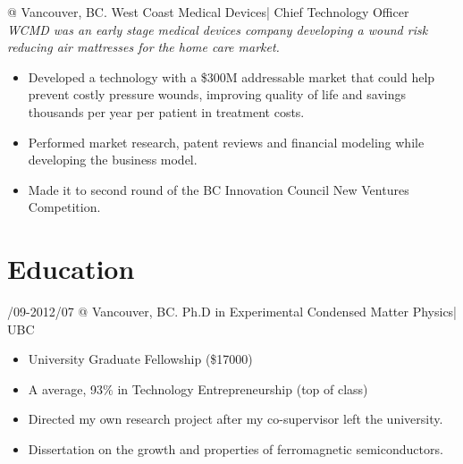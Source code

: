 \documentclass[10pt,letterpaper]{resume}
\begin{document}

 @ Vancouver, BC. West Coast Medical Devices| Chief Technology Officer
\textit{\\WCMD was an early stage medical devices company developing a wound risk reducing air mattresses for the home care market.}
\begin{itemize}
\item Developed a technology with a \$300M addressable market that could help prevent costly pressure wounds, improving quality of life and savings thousands per year per patient in treatment costs. 
\item Performed market research, patent reviews and financial modeling while developing the business model.
\item Made it to second round of the BC Innovation Council New Ventures Competition.
\end{itemize}



\section{Education}

/09-2012/07 @ Vancouver, BC. Ph.D in Experimental Condensed Matter Physics| UBC 
\begin{itemize}
\item University Graduate Fellowship (\$17000)
\item A average, 93$\%$ in Technology Entrepreneurship (top of class)
\item Directed my own research project after my co-supervisor left the university.
\item Dissertation on the growth and properties of ferromagnetic semiconductors.
\end{itemize}
\end{document}
